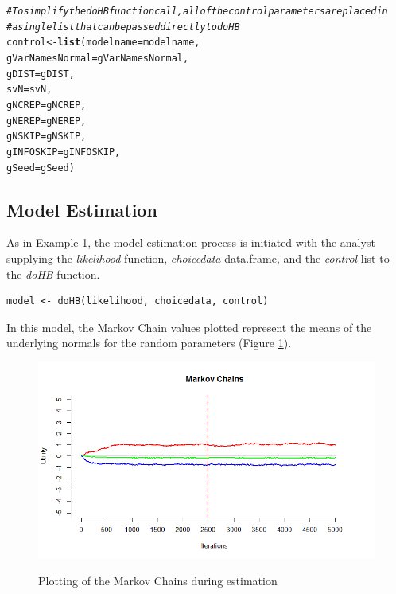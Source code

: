 \documentclass{article}\usepackage[]{graphicx}\usepackage[]{color}
\makeatletter
\newcommand{\hlcom}[1]{\textcolor[rgb]{0.678,0.584,0.686}{\textit{#1}}}%
\newcommand{\hlstd}[1]{\textcolor[rgb]{0.345,0.345,0.345}{#1}}%
\newcommand{\hlkwb}[1]{\textcolor[rgb]{0.69,0.353,0.396}{#1}}%
\newcommand{\hlkwc}[1]{\textcolor[rgb]{0.333,0.667,0.333}{#1}}%
\newcommand{\hlkwd}[1]{\textcolor[rgb]{0.737,0.353,0.396}{\textbf{#1}}}%
\newenvironment{kframe}{%
 \def\at@end@of@kframe{}%
 \ifinner\ifhmode%
  \def\at@end@of@kframe{\end{minipage}}%
  \begin{minipage}{\columnwidth}%
 \fi\fi%
 \def\FrameCommand##1{\hskip\@totalleftmargin \hskip-\fboxsep
 \colorbox{shadecolor}{##1}\hskip-\fboxsep
     \hskip-\linewidth \hskip-\@totalleftmargin \hskip\columnwidth}%
 \MakeFramed {\advance\hsize-\width
   \@totalleftmargin\z@ \linewidth\hsize
   \@setminipage}}%
 {\par\unskip\endMakeFramed%
 \at@end@of@kframe}
\newenvironment{knitrout}{}{} %
\makeatother
\begin{document}
\begin{knitrout}
\begin{kframe}
\begin{alltt}
\hlcom{# To simplify the doHB function call, all of the control parameters are placed in}
\hlcom{# a single list that can be passed directly to doHB}
\hlstd{control} \hlkwb{<-} \hlkwd{list}\hlstd{(}\hlkwc{modelname} \hlstd{= modelname,}
                \hlkwc{gVarNamesNormal} \hlstd{= gVarNamesNormal,}
                \hlkwc{gDIST} \hlstd{= gDIST,}
                \hlkwc{svN} \hlstd{= svN,}
                \hlkwc{gNCREP} \hlstd{= gNCREP,}
                \hlkwc{gNEREP} \hlstd{= gNEREP,}
                \hlkwc{gNSKIP} \hlstd{= gNSKIP,}
                \hlkwc{gINFOSKIP} \hlstd{= gINFOSKIP,}
                \hlkwc{gSeed} \hlstd{= gSeed)}
\end{alltt}
\end{kframe}
\end{knitrout}

\subsection*{Model Estimation}

As in Example 1, the model estimation process is initiated with the analyst supplying the \emph{likelihood} function, \emph{choicedata} data.frame, and the \emph{control} list to the \emph{doHB} function.

\begin{verbatim}
model <- doHB(likelihood, choicedata, control)
\end{verbatim}



In this model, the Markov Chain values plotted represent the means of the underlying normals for the random parameters (Figure \ref{MarkovChain2}).

\begin{figure}
\caption{Plotting of the Markov Chains during estimation}
\centering
\includegraphics[scale=0.50]{MMNL_MarkovChains.png}
\label{MarkovChain2}
\end{figure}
\end{document}
